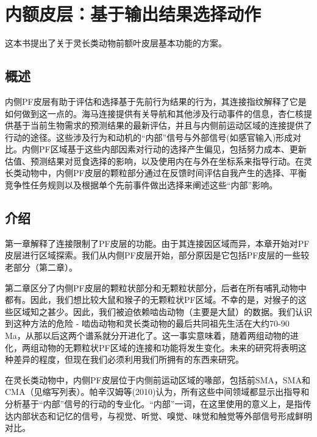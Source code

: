 \chapter{内额皮层：基于输出结果选择动作}
这本书提出了关于灵长类动物前额叶皮层基本功能的方案。

\section{概述}
内侧PF皮层有助于评估和选择基于先前行为结果的行为，其连接指纹解释了它是如何做到这一点的。海马连接提供有关导航和其他涉及行动事件的信息，杏仁核提供基于当前生物需求的预测结果的最新评估，并且与内侧前运动区域的连接提供了行动的途径。这些涉及行为和动机的“内部”信号与外部信号(如感官输入)形成对比。内侧PF区域基于这些内部因素对行动的选择产生偏见，包括努力成本、更新估值、预测结果对觅食选择的影响，以及使用内在与外在坐标系来指导行动。在灵长类动物中，内侧PF皮层的颗粒部分通过在反馈时间评估自我产生的选择、平衡竞争性任务规则以及根据单个先前事件做出选择来阐述这些“内部”影响。\par
\section{介绍}
第一章解释了连接限制了PF皮层的功能。由于其连接因区域而异，本章开始对PF皮层进行区域探索。我们从内侧PF皮层开始，部分原因是它包括PF皮层的一些较老部分（第二章）。\par
第二章区分了内侧PF皮层的颗粒状部分和无颗粒状部分，后者在所有哺乳动物中都有。因此，我们想比较大鼠和猴子的无颗粒状PF区域。不幸的是，对猴子的这些区域知之甚少。因此，我们被迫依赖啮齿动物（主要是大鼠）的数据。我们认识到这种方法的危险 - 啮齿动物和灵长类动物的最后共同祖先生活在大约70-90 Ma，从那以后这两个谱系就分开进化了。这一事实意味着，随着两组动物的进化，两组动物的无颗粒状PF区域的连接和功能将发生变化。未来的研究将表明这种差异的程度，但现在我们必须利用我们所拥有的东西来研究。\par
在灵长类动物中，内侧PF皮层位于内侧前运动区域的喙部，包括前SMA，SMA和CMA（见缩写列表）。帕辛汉姆等(2010)认为，所有这些中间领域都显示出指导和分析基于“内部”信号的行动的专业化。“内部”一词，在这里使用的意义上，是指传达内部状态和记忆的信号，与视觉、听觉、嗅觉、味觉和触觉等外部信号形成鲜明对比。


